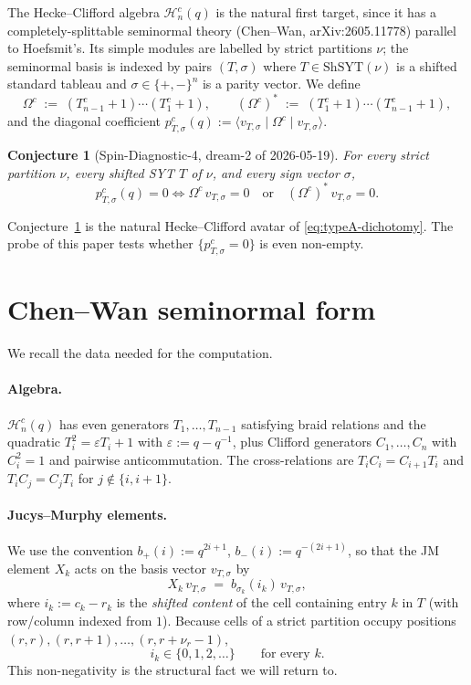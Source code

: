 \documentclass[11pt]{article}
\newtheorem{conjecture}{Conjecture}
\newcommand{\HC}{\mathcal{H}^{c}_{n}(q)}
\newcommand{\Om}{\Omega}
\newcommand{\Omc}{\Om^{c}}
\newcommand{\Omcstar}{(\Omc)^{*}}
\newcommand{\Tc}{T^{c}}
\newcommand{\ShSYT}{\mathrm{ShSYT}}
\begin{document}
The Hecke--Clifford algebra $\HC$ is the natural first target, since it has a
completely-splittable seminormal theory (Chen--Wan, arXiv:2605.11778) parallel
to Hoefsmit's. Its simple modules are labelled by strict partitions $\nu$; the
seminormal basis is indexed by pairs $(T,\sigma)$ where $T \in \ShSYT(\nu)$ is
a shifted standard tableau and $\sigma \in \{+,-\}^{n}$ is a parity vector.
We define
\[
\Omc \;:=\; (\Tc_{n-1}+1)\cdots(\Tc_{1}+1), \qquad
\Omcstar \;:=\; (\Tc_{1}+1)\cdots(\Tc_{n-1}+1),
\]
and the diagonal coefficient $p^{c}_{T,\sigma}(q)
:= \langle v_{T,\sigma} \mid \Omc \mid v_{T,\sigma}\rangle$.

\begin{conjecture}[Spin-Diagnostic-4, dream-2 of 2026-05-19]
\label{conj:spinD4}
For every strict partition $\nu$, every shifted SYT $T$ of $\nu$, and every
sign vector $\sigma$,
\[
p^{c}_{T,\sigma}(q) = 0 \iff
\Omc\, v_{T,\sigma} = 0 \quad\text{or}\quad \Omcstar\, v_{T,\sigma} = 0.
\]
\end{conjecture}

Conjecture~\ref{conj:spinD4} is the natural Hecke--Clifford avatar of
\eqref{eq:typeA-dichotomy}. The probe of this paper tests whether
$\{p^{c}_{T,\sigma} = 0\}$ is even non-empty.

\section{Chen--Wan seminormal form}

We recall the data needed for the computation.

\paragraph{Algebra.}
$\HC$ has even generators $T_1,\dots,T_{n-1}$ satisfying braid relations and
the quadratic $T_i^{2} = \varepsilon T_i + 1$ with $\varepsilon := q - q^{-1}$,
plus Clifford generators $C_1,\dots,C_n$ with $C_i^{2} = 1$ and pairwise
anticommutation. The cross-relations are $T_i C_i = C_{i+1} T_i$ and
$T_i C_j = C_j T_i$ for $j \notin \{i,i+1\}$.

\paragraph{Jucys--Murphy elements.}
We use the convention $b_{+}(i) := q^{2i+1}$, $b_{-}(i) := q^{-(2i+1)}$, so that
the JM element $X_k$ acts on the basis vector $v_{T,\sigma}$ by
\[
X_k\, v_{T,\sigma} \;=\; b_{\sigma_k}(i_k)\, v_{T,\sigma},
\]
where $i_k := c_k - r_k$ is the \emph{shifted content} of the cell containing
entry $k$ in $T$ (with row/column indexed from $1$). Because cells of a strict
partition occupy positions $(r, r), (r, r+1), \dots, (r, r + \nu_r - 1)$,
\[
i_k \in \{0, 1, 2, \dots\} \qquad \text{for every } k.
\]
This non-negativity is the structural fact we will return to.
\end{document}
